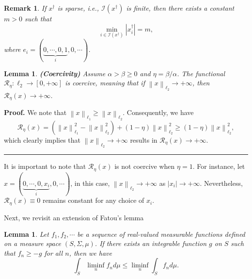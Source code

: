 \documentclass[a4paper,12pt]{article}
\newtheorem{lemma}[theorem]{Lemma}
\newtheorem{remark}[theorem]{Remark}
\numberwithin{equation}{section}
\newenvironment{proof}[1][Proof]{\textbf{#1.} }
{\ \rule{0.75em}{0.75em}\smallskip}
\begin{document}
\begin{remark}\label{rem2.4}
    If $x^{\dagger}$ is sparse, i.e., $\mathcal{I}(x^{\dagger})$ is finite, then there exists a constant $m>0$ such that
    \begin{equation*}
        \min_{i\in\mathcal{I}(x^{\dagger})}\left|x_{i}^{\dagger}\right|=m,
    \end{equation*}
    where $e_{i}=(\underbrace{0,\cdots,0,1}_{i},0,\cdots)$.
\end{remark}

\begin{lemma}\label{lem2.5}
    \textbf{(Coercivity)} Assume $\alpha>\beta\geq 0$ and $\eta=\beta/\alpha$. The functional $\mathcal{R}_{\eta}:\ell_{2}\rightarrow \left[0, +\infty\right]$ is coercive, meaning that if $\left\|x\right\|_{\ell_{2}}\rightarrow +\infty$, then $\mathcal{R}_{\eta}(x)\rightarrow +\infty$.
\end{lemma}

\begin{proof}
    We note that $\left\|x\right\|_{\ell_{1}}\geq\left\|x\right\|_{\ell_{2}}$. Consequently, we have
    \begin{equation*}
        \mathcal{R}_{\eta}\left(x\right)= \left(\left\|x\right\|_{\ell_{1}}^{2}-\left\|x\right\|_{\ell_{2}}^{2}\right)+ \left(1-\eta\right)\left\|x\right\|_{\ell_{2}}^{2} \geq \left(1-\eta\right)\left\|x\right\|_{\ell_{2}}^{2},
    \end{equation*}
    which clearly implies that $\left\|x\right\|_{\ell_{2}}\rightarrow +\infty$ results in $\mathcal{R}_{\eta}(x)\rightarrow +\infty$.
\end{proof}

\par It is important to note that $\mathcal{R}_{\eta}(x)$ is not coercive when $\eta=1$. For instance, let $x=(\underbrace{0,\cdots,0,x_{i}}_{i},0,\cdots)$, in this case, $\left\|x\right\|_{\ell_{2}}\rightarrow +\infty$ as $\left|x_{i}\right|\rightarrow +\infty$. Nevertheless, $\mathcal{R}_{\eta}(x)\equiv 0$ remains constant for any choice of $x_{i}$.

\par Next, we revisit an extension of Fatou's lemma \cite{C00}

\begin{lemma}\label{lem2.6}
    Let $f_{1}, f_{2}, \cdots$ be a sequence of real-valued measurable functions defined on a measure space $(S, \Sigma, \mu)$. If there exists an integrable function $g$ on $S$ such that $f_{n}\geq -g$ for all $n$, then we have
    \begin{equation*}
        \int_{S}\liminf_{n}f_{n}d\mu \leq \liminf_{n}\int_{S}f_{n}d\mu.
    \end{equation*} 
\end{lemma}
\end{document}

